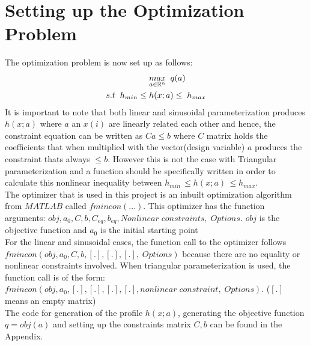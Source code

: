 \documentclass{article}
\begin{document}
\section{Setting up the Optimization Problem}
The optimization problem is now set up as follows: 
\begin{equation}
\centering
\begin{split}
&\underset{a \in  \mathbb{R}^n}{max}  \; \; q(a) \\  s.t \; \; h_{min} \leq \; & h(x;a) \leq \; h_{max} 
\end{split}
\end{equation}
It is important to note that both linear and sinusoidal parameterization produces $h(x;a)$ where $a$ an $x(i)$ are linearly related each other and hence, the constraint equation can be written as $Ca \leq b$ where $C$ matrix holds the coefficients that when multiplied with the vector(design variable) $a$ produces the constraint thats always $\leq b$. However this is not the case with Triangular parameterization and a function should be specifically written in order to calculate this nonlinear inequality between $h_{min} \,\leq h(x;a) \, \leq h_{max}$. \\
The optimizer that is used in this project is an inbuilt optimization algorithm from $MATLAB$ called $fmincon(...)$. This optimizer has the function arguments: $obj, a_0, C,b,C_{eq},b_{eq}, Nonlinear \; constraints, \; Options$. $obj$ is the objective function and $a_0$ is the initial starting point\\
For the linear and sinusoidal cases, the function call to the optimizer follows $fmincon(obj, a_0, C, b, [.],[.],[.], \; Options)$ because there are no equality or nonlinear constraints involved. When triangular parameterization is used, the function call is of the form: $fmincon(obj, a_0, [.],[.],[.],[.], nonlinear\; constraint,\; Options)$. ($[.]$ means an empty matrix)\\
The code for generation of the profile $h(x;a)$, generating the objective function $q = obj(a)$ and setting up the constraints matrix $C, b$ can be found in the Appendix.
\end{document}
